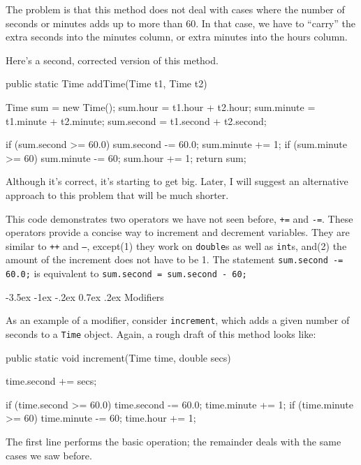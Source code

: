 \documentclass{book}
\makeatletter
\renewcommand{\section}{\@startsection 
    {section} {1} {0mm}%
    {-3.5ex \@plus -1ex \@minus -.2ex}%
    {0.7ex \@plus.2ex}%
    {\normalfont\Large\bfseries}}
\makeatother
\begin{document}
The problem is that this method does not deal with cases
where the number of seconds or minutes adds up to more than
60.  In that case, we have to ``carry'' the extra seconds
into the minutes column, or extra minutes into the hours
column.

Here's a second, corrected version of this method.

\begin{verbatimtab}
  public static Time addTime(Time t1, Time t2) {
    Time sum = new Time();
    sum.hour = t1.hour + t2.hour;
    sum.minute = t1.minute + t2.minute;
    sum.second = t1.second + t2.second;

    if (sum.second >= 60.0) {
      sum.second -= 60.0;
      sum.minute += 1;
    }
    if (sum.minute >= 60) {
      sum.minute -= 60;
      sum.hour += 1;
    }
    return sum;
  }
\end{verbatimtab}
%
Although it's correct, it's starting to get big.  Later,
I will suggest an alternative approach to this problem that
will be much shorter.


This code demonstrates two operators we have not seen before,
{\tt +=} and {\tt -=}.  These operators provide a concise
way to increment and decrement variables.  They are similar
to {\tt ++} and {\tt --}, except(1) they work on {\tt double}s
as well as {\tt int}s, and(2) the amount of the increment
does not have to be 1.  The statement {\tt sum.second -= 60.0;}
is equivalent to {\tt sum.second = sum.second - 60;}

\section{Modifiers}

As an example of a modifier, consider {\tt increment},
which adds a given number of seconds to a {\tt Time} object.
Again, a rough draft of this method looks like:

\begin{verbatimtab}
  public static void increment(Time time, double secs) {
    time.second += secs;

    if (time.second >= 60.0) {
      time.second -= 60.0;
      time.minute += 1;
    }
    if (time.minute >= 60) {
      time.minute -= 60;
      time.hour += 1;
    }
  }
\end{verbatimtab}
%
The first line performs the basic operation; the remainder
deals with the same cases we saw before.
\end{document}
